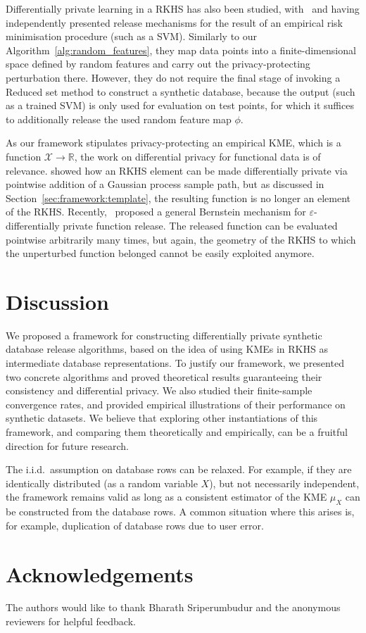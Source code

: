 \documentclass{article}
\newcommand{\calX}{\mathcal{X}}			%
\newcommand{\IR}{\mathbb{R}}  			%
\theoremstyle{plain}
\theoremstyle{remark}
\theoremstyle{definition}
\begin{document}
Differentially private learning in a RKHS has also been studied, with~\citet{chaudhuri_differentially_2011} and \citet{rubinstein_svm_2012} having independently presented release mechanisms for the result of an empirical risk minimisation procedure (such as a SVM). Similarly to our Algorithm~\ref{alg:random_features}, they map data points into a finite-dimensional space defined by random features and carry out the privacy-protecting perturbation there. However, they do not require the final stage of invoking a Reduced set method to construct a synthetic database, because the output (such as a trained SVM) is only used for evaluation on test points, for which it suffices to additionally release the used random feature map $\phi$.

As our framework stipulates privacy-protecting an empirical KME, which is a function $\calX \to \IR$, the work on differential privacy for functional data is of relevance. \citet{hall_differential_2013} showed how an RKHS element can be made differentially private via pointwise addition of a Gaussian process sample path, but as discussed in Section~\ref{sec:framework:template}, the resulting function is no longer an element of the RKHS. Recently,~\citet{alda_bernstein_2017} proposed a general Bernstein mechanism for $\varepsilon$-differentially private function release. The released function can be evaluated pointwise arbitrarily many times, but again, the geometry of the RKHS to which the unperturbed function belonged cannot be easily exploited anymore.



\section{Discussion}
\label{sec:discussion}

We proposed a framework for constructing differentially private synthetic database release algorithms, based on the idea of using KMEs in RKHS as intermediate database representations.
To justify our framework, we presented two concrete algorithms and proved theoretical results guaranteeing their consistency and differential privacy.
We also studied their finite-sample convergence rates, and provided empirical illustrations of their performance on synthetic datasets.
We believe that exploring other instantiations of this framework, and comparing them theoretically and empirically, can be a fruitful direction for future research.

The i.i.d.~assumption on database rows can be relaxed. For example, if they are identically distributed (as a random variable $X$), but not necessarily independent, the framework remains valid as long as a consistent estimator of the KME $\mu_X$ can be constructed from the database rows. A common situation where this arises is, for example, duplication of database rows due to user error.



\section*{Acknowledgements}
The authors would like to thank Bharath Sriperumbudur and the anonymous reviewers for helpful feedback.

\begin{small}


\end{small}

\clearpage
\newpage
\onecolumn
\appendix


\end{document}
